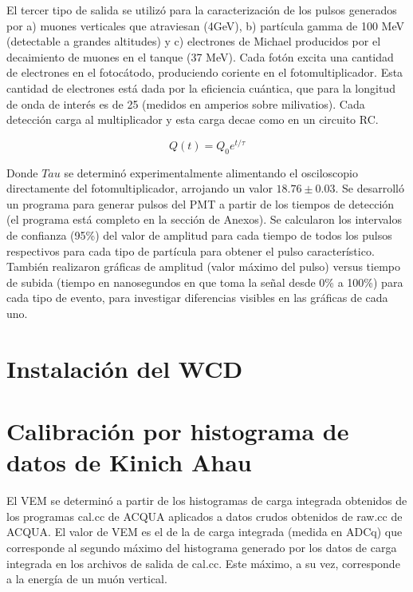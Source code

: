 \documentclass{book}
\begin{document}
El tercer tipo de salida se utiliz\'o para la caracterizaci\'on de los pulsos generados por a) muones verticales que atraviesan (4GeV), b) part\'icula gamma de 100 MeV (detectable a grandes altitudes) y c) electrones de Michael producidos por el decaimiento de muones en el tanque (37 MeV). Cada fot\'on excita una cantidad de electrones en el fotoc\'atodo, produciendo coriente en el fotomultiplicador. Esta cantidad de electrones est\'a dada por la eficiencia cu\'antica, que para la longitud de onda de inter\'es es de 25 (medidos en amperios sobre milivatios). Cada detecci\'on carga al multiplicador y esta carga decae como en un circuito RC.

\begin{equation}
Q(t)=Q_0e^{t/\tau}
\end{equation}

Donde $Tau$ se determin\'o experimentalmente alimentando el osciloscopio directamente del fotomultiplicador, arrojando un valor $18.76\pm0.03$. Se desarroll\'o un programa para generar pulsos del PMT a partir de los tiempos de detecci\'on (el programa est\'a completo en la secci\'on de Anexos). Se calcularon los intervalos de confianza (95\%) del valor de amplitud para cada tiempo de todos los pulsos respectivos para cada tipo de part\'icula para obtener el pulso caracter\'istico. Tambi\'en realizaron gr\'aficas de amplitud (valor m\'aximo del pulso) versus tiempo de subida (tiempo en nanosegundos en que toma la se\~nal desde 0\% a 100\%) para cada tipo de evento, para investigar diferencias visibles en las gr\'aficas de cada uno.

\section{Instalaci\'on del WCD}

\section{Calibraci\'on por histograma de datos de Kinich Ahau}
El VEM se determin\'o a partir de los histogramas de carga integrada obtenidos de los programas cal.cc de ACQUA aplicados a datos crudos obtenidos de raw.cc de ACQUA. El valor de VEM es el de la de carga integrada (medida en ADCq) que corresponde al segundo m\'aximo del histograma generado por los datos de carga integrada en los archivos de salida de cal.cc. Este m\'aximo, a su vez, corresponde a la energ\'ia de un mu\'on vertical.
\end{document}
